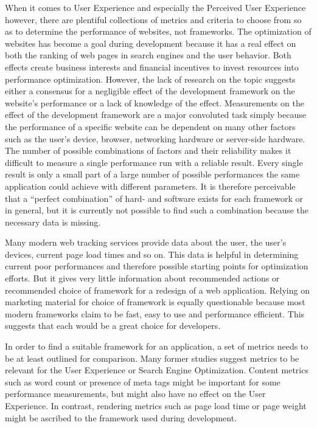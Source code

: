 \documentclass[a4paper, fontsize=11pt]{article}
\begin{document}
When it comes to User Experience and especially the Perceived User Experience however, there are plentiful collections of metrics and criteria to choose from so as to determine the performance of websites, not frameworks.
The optimization of websites has become a goal during development because it has a real effect on both the ranking of web pages in search engines and the user behavior.
Both effects create business interests and financial incentives to invest resources into performance optimization.
However, the lack of research on the topic suggests either a consensus for a negligible effect of the development framework on the website's performance or a lack of knowledge of the effect.
Measurements on the effect of the development framework are a major convoluted task simply because the performance of a specific website can be dependent on many other factors such as the user's device, browser, networking hardware or server-side hardware.
The number of possible combinations of factors and their reliability makes it difficult to measure a single performance run with a reliable result.
Every single result is only a small part of a large number of possible performances the same application could achieve with different parameters.
It is therefore perceivable that a \enquote{perfect combination} of hard- and software exists for each framework or in general, but it is currently not possible to find such a combination because the necessary data is missing.

Many modern web tracking services provide data about the user, the user's devices, current page load times and so on.
This data is helpful in determining current poor performances and therefore possible starting points for optimization efforts.
But it gives very little information about recommended actions or recommended choice of framework for a redesign of a web application.
Relying on marketing material for choice of framework is equally questionable because most modern frameworks claim to be fast, easy to use and performance efficient.
This suggests that each would be a great choice for developers.

In order to find a suitable framework for an application, a set of metrics needs to be at least outlined for comparison.
Many former studies suggest metrics to be relevant for the User Experience or Search Engine Optimization.
Content metrics such as word count or presence of meta tags might be important for some performance measurements, but might also have no effect on the User Experience.
In contrast, rendering metrics such as page load time or page weight might be ascribed to the framework used during development.
\end{document}
